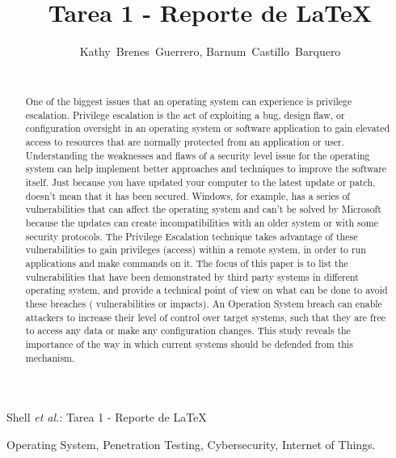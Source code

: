 \documentclass[letterpaper, 10pt, journal]{IEEEtran}
\begin{document}
\title{Tarea 1 - Reporte de \LaTeX  }
\author{Kathy~Brenes~Guerrero, Barnum~Castillo~Barquero

~}%

%
{Shell \MakeLowercase{\textit{et al.}}: Tarea 1 - Reporte de \LaTeX  }
\maketitle

\begin{abstract}
One of the biggest issues that an operating system can experience is privilege escalation. Privilege escalation is the act of exploiting a bug, design flaw, or configuration oversight in an operating system or software application to gain elevated access to resources that are normally protected from an application or user. Understanding the weaknesses and flaws of a security level issue for the operating system can help implement better approaches and techniques to improve the software itself. Just because you have updated your computer to the latest update or patch, doesn’t mean that it has been secured. Windows, for example, has a series of vulnerabilities that can affect the operating system and can't be solved by Microsoft because the updates can create incompatibilities with an older system or with some security protocols. The Privilege Escalation technique takes advantage of these vulnerabilities to  gain privileges (access) within a remote  system, in order to run applications and make commands on it. The focus of this paper is to list the vulnerabilities that have been demonstrated by third party systems in different operating system, and provide a technical point of view  on what can be done to avoid these breaches ( vulnerabilities or impacts). An Operation System breach can enable attackers to increase their level of control over target systems, such that they are free to access any data or make any configuration changes\cite{Williams}. This study reveals the importance of the way in which current systems should be defended from this mechanism.
\end{abstract}
\begin{IEEEkeywords}
Operating System, Penetration Testing, Cybersecurity, Internet of Things.
\end{IEEEkeywords}
\end{document}
